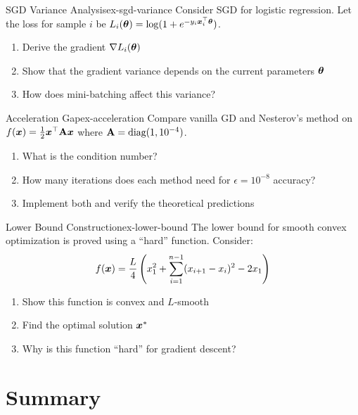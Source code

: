 \documentclass[../../main.tex]{subfiles}
\begin{document}
\begin{exercise}{SGD Variance Analysis}{ex-sgd-variance}
Consider SGD for logistic regression. Let the loss for sample $i$ be $L_i(\boldsymbol{\theta}) = \log(1 + e^{-y_i \boldsymbol{x}_i^\top \boldsymbol{\theta}})$.
\begin{enumerate}[label=(\alph*)]
    \item Derive the gradient $\nabla L_i(\boldsymbol{\theta})$
    \item Show that the gradient variance depends on the current parameters $\boldsymbol{\theta}$
    \item How does mini-batching affect this variance?
\end{enumerate}
\end{exercise}

\begin{exercise}{Acceleration Gap}{ex-acceleration}
Compare vanilla GD and Nesterov's method on $f(\boldsymbol{x}) = \frac{1}{2}\boldsymbol{x}^\top \mathbf{A} \boldsymbol{x}$ where $\mathbf{A} = \text{diag}(1, 10^{-4})$.
\begin{enumerate}[label=(\alph*)]
    \item What is the condition number?
    \item How many iterations does each method need for $\epsilon = 10^{-8}$ accuracy?
    \item Implement both and verify the theoretical predictions
\end{enumerate}
\end{exercise}

\begin{exercise}{Lower Bound Construction}{ex-lower-bound}
The lower bound for smooth convex optimization is proved using a ``hard'' function. Consider:
\[
    f(\boldsymbol{x}) = \frac{L}{4}\left(x_1^2 + \sum_{i=1}^{n-1}(x_{i+1} - x_i)^2 - 2x_1\right)
\]
\begin{enumerate}[label=(\alph*)]
    \item Show this function is convex and $L$-smooth
    \item Find the optimal solution $\boldsymbol{x}^*$
    \item Why is this function ``hard'' for gradient descent?
\end{enumerate}
\end{exercise}

\section{Summary}
\label{sec:conv-summary}
\end{document}
